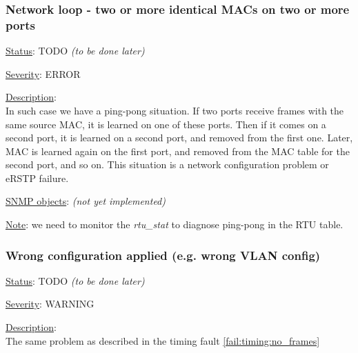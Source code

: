 \subsubsection{\bf Network loop - two or more identical MACs on two or more ports}
		\label{fail:data:net_loop}
		\begin{packed_enum}
			\item [] \underline{Status}: TODO \emph{(to be done later)}
			\item [] \underline{Severity}: ERROR
			\item [] \underline{Description}:\\
				In such case we have a ping-pong situation. If two ports receive frames
				with the same source MAC, it is learned on one of these ports. Then if
				it comes on a second port, it is learned on a second port, and removed
				from the first one. Later, MAC is learned again on the first port, and
				removed from the MAC table for the second port, and so on. This
				situation is a network configuration problem or eRSTP failure.
			\item [] \underline{SNMP objects}: \emph{(not yet implemented)}
			\item [] \underline{Note}: we need to monitor the \emph{rtu\_stat} to
				diagnose ping-pong in the RTU table.
		\end{packed_enum}

\subsubsection{\bf Wrong configuration applied (e.g. wrong VLAN config)}
		\begin{packed_enum}
			\item [] \underline{Status}: TODO \emph{(to be done later)}
			\item [] \underline{Severity}: WARNING
			\item [] \underline{Description}:\\
				The same problem as described in the timing fault
				\ref{fail:timing:no_frames}
		\end{packed_enum}

